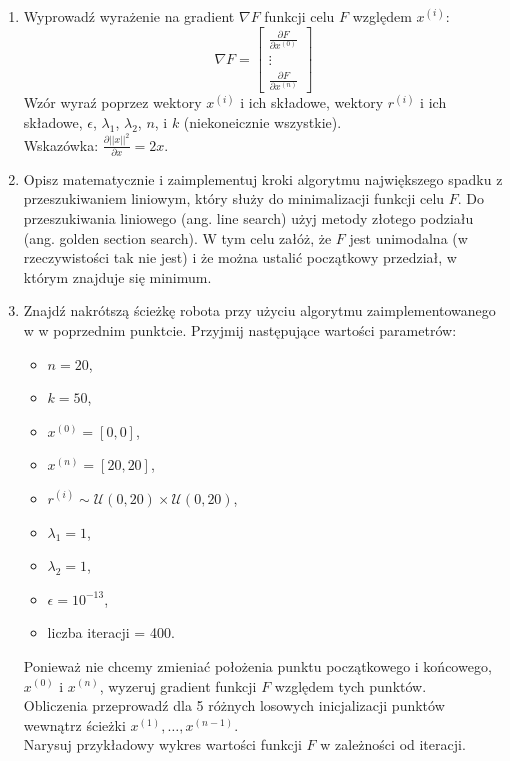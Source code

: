 \documentclass[11pt, leqno]{scrartcl}
\begin{document}
    \begin{enumerate}
        \item Wyprowadź wyrażenie na gradient $\nabla F$ funkcji
            celu $F$ względem $x^{(i)}$:
            \[
                \nabla F=
                \begin{bmatrix}
                    \frac{\partial F}{\partial x^{(0)}} \\
                    \vdots \\
                    \frac{\partial F}{\partial x^{(n)}}
                \end{bmatrix}
            \]
            Wzór wyraź poprzez wektory $x^{(i)}$ i ich składowe,
            wektory $r^{(i)}$ i ich składowe, $\epsilon$,
            $\lambda _1$, $\lambda _2$, $n$, i $k$ (niekoneicznie
            wszystkie). \\
            Wskazówka: $\frac{\partial ||x||^2}{\partial x}=2x$.
        \item Opisz matematycznie i zaimplementuj kroki algorytmu
            największego spadku z przeszukiwaniem liniowym, który
            służy do minimalizacji funkcji celu $F$. Do
            przeszukiwania liniowego (ang. line search) użyj metody
            złotego podziału (ang. golden section search). W tym
            celu załóż, że $F$ jest unimodalna (w rzeczywistości tak
            nie jest) i że można ustalić początkowy przedział,
            w którym znajduje się minimum.
        \item Znajdź nakrótszą ścieżkę robota przy użyciu algorytmu
            zaimplementowanego w w poprzednim punktcie. Przyjmij
            następujące wartości parametrów:
            \begin{itemize}
                \item $n=20$,
                \item $k=50$,
                \item $x^{(0)}=[0,0]$,
                \item $x^{(n)}=[20,20]$,
                \item $r^{(i)}\sim \mathcal{U}(0,20)\times
                    \mathcal{U}(0,20)$,
                \item $\lambda _1=1$,
                \item $\lambda _2=1$,
                \item $\epsilon =10^{-13}$,
                \item liczba iteracji = 400.
            \end{itemize}
            Ponieważ nie chcemy zmieniać położenia punktu
            początkowego i końcowego, $x^{(0)}$ i $x^{(n)}$,
            wyzeruj gradient funkcji $F$ względem tych punktów. \\
            Obliczenia przeprowadź dla 5 różnych losowych
            inicjalizacji punktów wewnątrz ścieżki
            $x^{(1)},\ldots,x^{(n-1)}$. \\
            Narysuj przykładowy wykres wartości funkcji $F$
            w zależności od iteracji.
    \end{enumerate}
\end{document}
